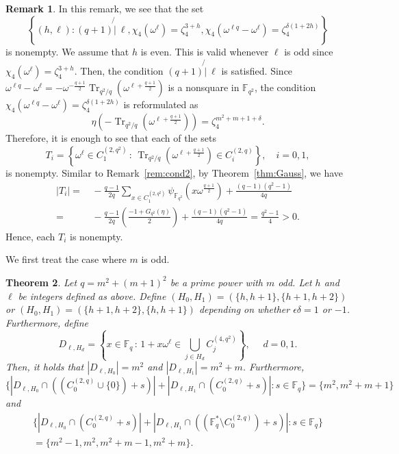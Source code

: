 \documentclass[10pt]{amsart}
\newtheorem{theo}{Theorem}[section]
\theoremstyle{definition}
\newtheorem{rema}[theo]{Remark}
\DeclareMathOperator{\Tr}{Tr}
\newcommand*\F{{\mathbb F}}
\newcommand*{\notmid}{\mathbin{\not{|}\:}}
\begin{document}
\begin{rema}\label{rem:cond24}
In this remark, we see that the set
\[
\left\{(h,\ell):(q+1) \notmid \ell, \chi_4(\omega^{\ell})=\zeta_4^{3+h},
\chi_4(\omega^{\ell q}-\omega^{\ell})=\zeta_4^{\delta (1+2h)} \right\}
\]
is nonempty. We assume that $h$ is even. This is valid whenever $\ell$ is odd since $ \chi_4(\omega^{\ell})=\zeta_4^{3+h}$. Then, the condition $(q+1)\notmid \ell$ is satisfied. Since $\omega^{\ell q}-\omega^\ell=-\omega^{-\frac{q+1}{2}}\Tr_{q^2/q}(\omega^{\ell+\frac{q+1}{2}})$ is a nonsquare in $\F_{q^2}$, the condition $\chi_4(\omega^{\ell q}-\omega^{\ell})=\zeta_4^{\delta (1+2h)}$ is reformulated as
\[
\eta(-\Tr_{q^2/q}(\omega^{\ell+\frac{q+1}{2}}))=\zeta_4^{m^2+m+1+\delta }.
\]
Therefore, it is enough to see that each of the sets
\[
T_i=\left\{\omega^\ell\in C_{1}^{(2,q^2)}\,:\,\Tr_{q^2/q}(\omega^{\ell+\frac{q+1}{2}})\in C_i^{(2,q)}\right\}, \quad i=0,1,
\]
is nonempty. Similar to Remark~\ref{rem:cond2}, by Theorem~\ref{thm:Gauss}, we have
\begin{align*}
|T_i|=&\,-\frac{q-1}{2q}\sum_{x\in C_1^{(2,q^2)}}\psi_{\F_{q^2}}(x\omega^{\frac{q+1}{2}})+\frac{(q-1)(q^2-1)}{4q}\\
=&\,-\frac{q-1}{2q}\left(\frac{-1+G_{q^2}(\eta)}{2}\right)+\frac{(q-1)(q^2-1)}{4q}=\frac{q^2-1}{4}>0.
\end{align*}
Hence, each $T_i$ is nonempty.
\end{rema}

We first treat the case where $m$ is odd.

\begin{theo}\label{thm:twoint2}
Let $q=m^2+(m+1)^2$ be a prime power with $m$ odd. Let $h$ and $\ell$ be integers defined as above. Define $(H_0,H_1)=(\{h,h+1\},\{h+1,h+2\})$ or $(H_0,H_1)=(\{h+1,h+2\},\{h,h+1\})$ depending on whether $\epsilon \delta=1$ or $-1$. Furthermore, define
\[
D_{\ell,H_d}=\left\{x\in \F_q\,:\, 1+x\omega^\ell\in \bigcup_{j\in H_d}C_j^{(4,q^2)} \right\}, \quad \, \, d=0,1.
\]
Then, it holds that $|D_{\ell,H_0}|=m^2$ and $|D_{\ell,H_1}|=m^2+m$. Furthermore,
\[
\{|D_{\ell,H_0}\cap ((C_0^{(2,q)}\cup \{0\})+s)|+|D_{\ell,H_1}\cap (C_0^{(2,q)}+s)|:s\in \F_q\}=\{m^2,m^2+m+1\}
\]
and
\begin{multline*}
\{|D_{\ell,H_0}\cap (C_0^{(2,q)}+s)|+|D_{\ell,H_1}\cap ((\F_q^\ast\setminus C_0^{(2,q)})+s)|:s\in \F_q\}\\= \{m^2-1,m^2,m^2+m-1,m^2+m\}.
\end{multline*}
\end{theo}
\end{document}
